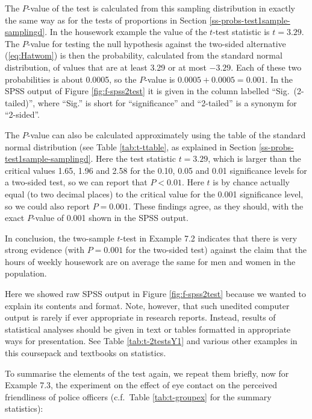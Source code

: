 \documentclass[11pt,a4paper,openany]{book}
\begin{document}
The \(P\)-value of the test is calculated from this sampling
distribution in exactly the same way as for the tests of proportions in
Section \ref{ss-probs-test1sample-samplingd}. In the housework example
the value of the \(t\)-test statistic is \(t=3.29\). The \(P\)-value for
testing the null hypothesis against the two-sided alternative
(\ref{eq:Hatwom}) is then the probability, calculated from the standard
normal distribution, of values that are at least 3.29 or at most
\(-3.29\). Each of these two probabilities is about 0.0005, so the
\(P\)-value is \(0.0005+0.0005=0.001\). In the SPSS output of Figure
\ref{fig:f-spss2test} it is given in the column labelled
``Sig.~(2-tailed)'', where ``Sig.'' is short for ``significance'' and
``2-tailed'' is a synonym for ``2-sided''.

The \(P\)-value can also be calculated approximately using the table of
the standard normal distribution (see Table \ref{tab:t-ttable}, as
explained in Section \ref{ss-probs-test1sample-samplingd}. Here the test
statistic \(t=3.29\), which is larger than the critical values 1.65,
1.96 and 2.58 for the 0.10, 0.05 and 0.01 significance levels for a
two-sided test, so we can report that \(P<0.01\). Here \(t\) is by
chance actually equal (to two decimal places) to the critical value for
the 0.001 significance level, so we could also report \(P=0.001\). These
findings agree, as they should, with the exact \(P\)-value of 0.001
shown in the SPSS output.

In conclusion, the two-sample \(t\)-test in Example 7.2 indicates that
there is very strong evidence (with \(P=0.001\) for the two-sided test)
against the claim that the hours of weekly housework are on average the
same for men and women in the population.

Here we showed raw SPSS output in Figure \ref{fig:f-spss2test} because
we wanted to explain its contents and format. Note, however, that such
unedited computer output is rarely if ever appropriate in research
reports. Instead, results of statistical analyses should be given in
text or tables formatted in appropriate ways for presentation. See Table
\ref{tab:t-2testsY1} and various other examples in this coursepack and
textbooks on statistics.

To summarise the elements of the test again, we repeat them briefly, now
for Example 7.3, the experiment on the effect of eye contact on the
perceived friendliness of police officers (c.f.~Table
\ref{tab:t-groupex} for the summary statistics):
\end{document}
